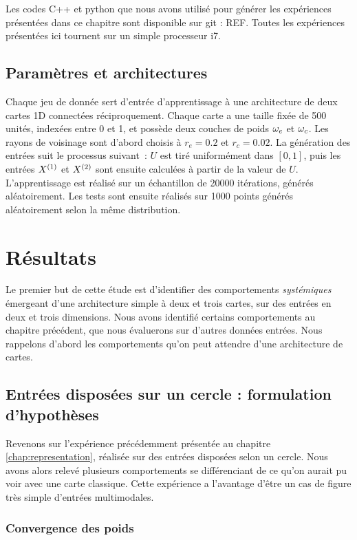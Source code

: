 \documentclass[../main]{subfiles}
\begin{document}
Les codes C++ et python que nous avons utilisé pour générer les expériences présentées dans ce chapitre sont disponible sur git : REF.
Toutes les expériences présentées ici tournent sur un simple processeur i7.

\subsection{Paramètres et architectures}

Chaque jeu de donnée sert d'entrée d'apprentissage à une architecture de deux cartes 1D connectées réciproquement. Chaque carte a une taille fixée de 500 unités, indexées entre 0 et 1, et possède deux couches de poids $\omega_e$ et $\omega_c$. Les rayons de voisinage sont d'abord choisis à $r_e = 0.2$ et $r_c = 0.02$.
La génération des entrées suit le processus suivant~: $U$ est tiré uniformément dans $[0,1]$, puis les entrées $X^{({1})}$ et $X^{({2})}$ sont ensuite calculées à partir de la valeur de $U$.
L'apprentissage est réalisé sur un échantillon de 20000 itérations, générés aléatoirement. Les tests sont ensuite réalisés sur 1000 points générés aléatoirement selon la même distribution.

\section{Résultats}

Le premier but de cette étude est d'identifier des comportements \emph{systémiques} émergeant d'une architecture simple à deux et trois cartes, sur des entrées en deux et trois dimensions.
Nous avons identifié certains comportements au chapitre précédent, que nous évaluerons sur d'autres données entrées. Nous rappelons d'abord les comportements qu'on peut attendre d'une architecture de cartes.

\subsection{Entrées disposées sur un cercle : formulation d'hypothèses}

Revenons sur l'expérience précédemment présentée au chapitre \ref{chap:representation}, réalisée sur des entrées disposées selon un cercle. Nous avons alors relevé plusieurs comportements se différenciant de ce qu'on aurait pu voir avec une carte classique. Cette expérience a l'avantage d'être un cas de figure très simple d'entrées multimodales.

\subsubsection{Convergence des poids}
\end{document}
